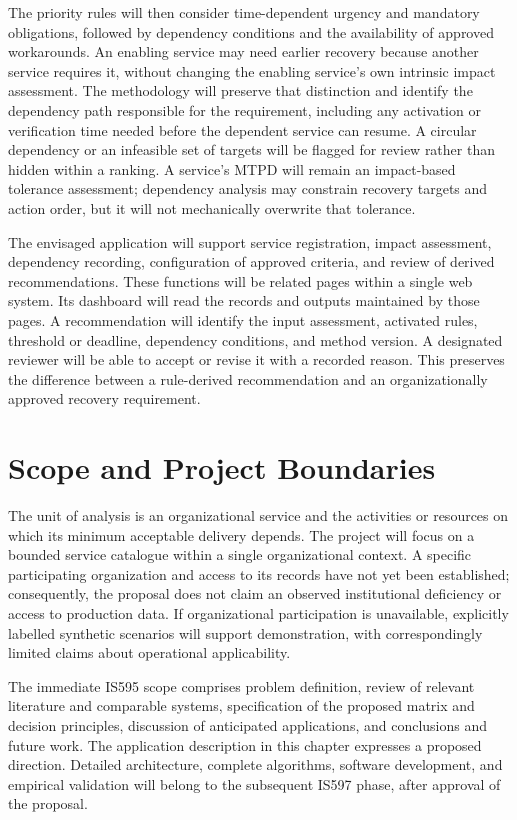 The priority rules will then consider time-dependent urgency and mandatory obligations, followed by dependency conditions and the availability of approved workarounds. An enabling service may need earlier recovery because another service requires it, without changing the enabling service's own intrinsic impact assessment. The methodology will preserve that distinction and identify the dependency path responsible for the requirement, including any activation or verification time needed before the dependent service can resume. A circular dependency or an infeasible set of targets will be flagged for review rather than hidden within a ranking. A service's MTPD will remain an impact-based tolerance assessment; dependency analysis may constrain recovery targets and action order, but it will not mechanically overwrite that tolerance.

The envisaged application will support service registration, impact assessment, dependency recording, configuration of approved criteria, and review of derived recommendations. These functions will be related pages within a single web system. Its dashboard will read the records and outputs maintained by those pages. A recommendation will identify the input assessment, activated rules, threshold or deadline, dependency conditions, and method version. A designated reviewer will be able to accept or revise it with a recorded reason. This preserves the difference between a rule-derived recommendation and an organizationally approved recovery requirement.

\section{Scope and Project Boundaries}
\label{sec:intro-scope}

The unit of analysis is an organizational service and the activities or resources on which its minimum acceptable delivery depends. The project will focus on a bounded service catalogue within a single organizational context. A specific participating organization and access to its records have not yet been established; consequently, the proposal does not claim an observed institutional deficiency or access to production data. If organizational participation is unavailable, explicitly labelled synthetic scenarios will support demonstration, with correspondingly limited claims about operational applicability.

The immediate IS595 scope comprises problem definition, review of relevant literature and comparable systems, specification of the proposed matrix and decision principles, discussion of anticipated applications, and conclusions and future work. The application description in this chapter expresses a proposed direction. Detailed architecture, complete algorithms, software development, and empirical validation will belong to the subsequent IS597 phase, after approval of the proposal.

